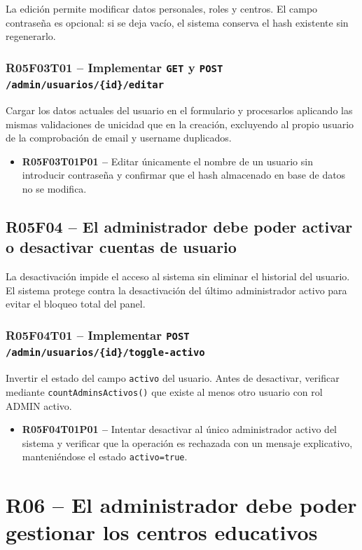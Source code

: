 \documentclass[12pt, a4paper]{report}
\begin{document}
La edición permite modificar datos personales, roles y centros. El campo contraseña es opcional: si se deja vacío, el sistema conserva el hash existente sin regenerarlo.

\subsubsection{R05F03T01 -- Implementar \texttt{GET} y \texttt{POST /admin/usuarios/\{id\}/editar}}
Cargar los datos actuales del usuario en el formulario y procesarlos aplicando las mismas validaciones de unicidad que en la creación, excluyendo al propio usuario de la comprobación de email y username duplicados.
\begin{itemize}
  \item \textbf{R05F03T01P01 --} Editar únicamente el nombre de un usuario sin introducir contraseña y confirmar que el hash almacenado en base de datos no se modifica.
\end{itemize}

\subsection{R05F04 -- El administrador debe poder activar o desactivar cuentas de usuario}

La desactivación impide el acceso al sistema sin eliminar el historial del usuario. El sistema protege contra la desactivación del último administrador activo para evitar el bloqueo total del panel.

\subsubsection{R05F04T01 -- Implementar \texttt{POST /admin/usuarios/\{id\}/toggle-activo}}
Invertir el estado del campo \texttt{activo} del usuario. Antes de desactivar, verificar mediante \texttt{countAdminsActivos()} que existe al menos otro usuario con rol ADMIN activo.
\begin{itemize}
  \item \textbf{R05F04T01P01 --} Intentar desactivar al único administrador activo del sistema y verificar que la operación es rechazada con un mensaje explicativo, manteniéndose el estado \texttt{activo=true}.
\end{itemize}

\section{R06 -- El administrador debe poder gestionar los centros educativos}
\end{document}

